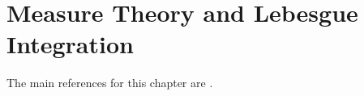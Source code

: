 \chapter{Measure Theory and Lebesgue Integration}\label{chapter:lebesgue}

    The main references for this chapter are \cite{measure, AMP1}.





